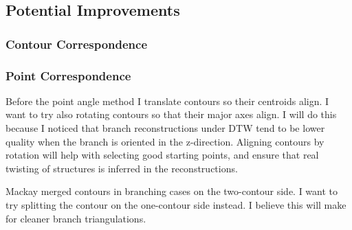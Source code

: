 \documentclass[11pt]{article}
\begin{document}
\subsection{Potential Improvements}

\subsubsection{Contour Correspondence}

\subsubsection{Point Correspondence}

Before the point angle method I translate contours so their centroids align. I want to try also rotating contours so that their major axes align. I will do this because I noticed that branch reconstructions under DTW tend to be lower quality when the branch is oriented in the z-direction. Aligning contours by rotation will help with selecting good starting points, and ensure that real twisting of structures is inferred in the reconstructions.

Mackay merged contours in branching cases on the two-contour side. I want to try splitting the contour on the one-contour side instead. I believe this will make for cleaner branch triangulations.

\pagebreak


\end{document}
